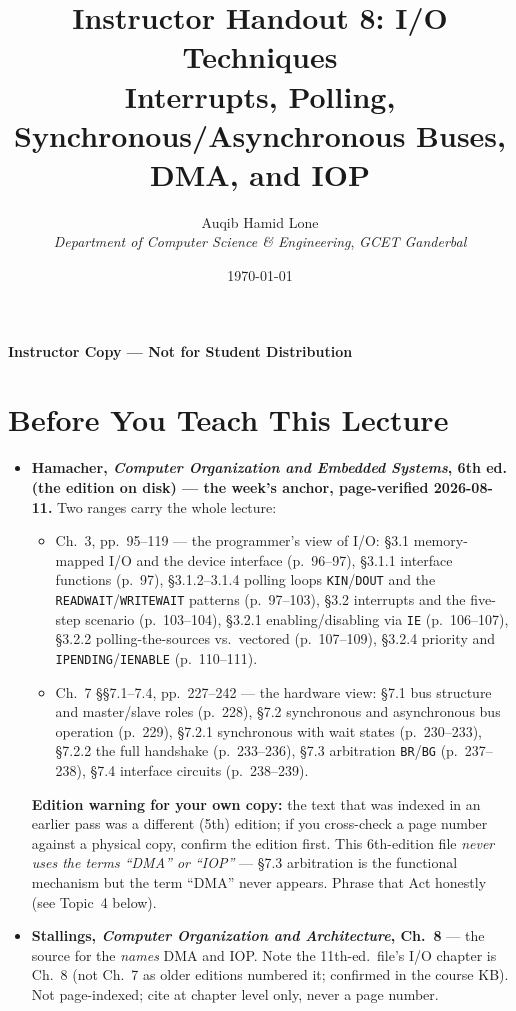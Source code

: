 \documentclass[11pt]{article}
\title{Instructor Handout 8: I/O Techniques\\\large Interrupts, Polling, Synchronous/Asynchronous Buses, DMA, and IOP}
\author{Auqib Hamid Lone\\[0.3em]
  \emph{Department of Computer Science \& Engineering}, \emph{GCET Ganderbal}}
\date{\today}
\begin{document}
\maketitle
{\centering\large\color{negative}\textbf{Instructor Copy --- Not for Student Distribution}\par}
\vspace{0.5cm}

\section{Before You Teach This Lecture}

\begin{sloppypar}
\begin{itemize}
  \item \textbf{Hamacher, \textit{Computer Organization and Embedded Systems}, 6th ed. (the edition on disk) --- the week's anchor, page-verified 2026-08-11.} Two ranges carry the whole lecture:
    \begin{itemize}
      \item Ch.~3, pp.~95--119 --- the programmer's view of I/O: \S3.1 memory-mapped I/O and the device interface (p.~96--97), \S3.1.1 interface functions (p.~97), \S3.1.2--3.1.4 polling loops \texttt{KIN}/\texttt{DOUT} and the \texttt{READWAIT}/\texttt{WRITEWAIT} patterns (p.~97--103), \S3.2 interrupts and the five-step scenario (p.~103--104), \S3.2.1 enabling/disabling via \texttt{IE} (p.~106--107), \S3.2.2 polling-the-sources vs.\ vectored (p.~107--109), \S3.2.4 priority and \texttt{IPENDING}/\texttt{IENABLE} (p.~110--111).
      \item Ch.~7 \S\S7.1--7.4, pp.~227--242 --- the hardware view: \S7.1 bus structure and master/slave roles (p.~228), \S7.2 synchronous and asynchronous bus operation (p.~229), \S7.2.1 synchronous with wait states (p.~230--233), \S7.2.2 the full handshake (p.~233--236), \S7.3 arbitration \texttt{BR}/\texttt{BG} (p.~237--238), \S7.4 interface circuits (p.~238--239).
    \end{itemize}
    \textbf{Edition warning for your own copy:} the text that was indexed in an earlier pass was a different (5th) edition; if you cross-check a page number against a physical copy, confirm the edition first. This 6th-edition file \emph{never uses the terms ``DMA'' or ``IOP''} --- \S7.3 arbitration is the functional mechanism but the term ``DMA'' never appears. Phrase that Act honestly (see Topic~4 below).
  \item \textbf{Stallings, \textit{Computer Organization and Architecture}, Ch.~8} --- the source for the \emph{names} DMA and IOP. Note the 11th-ed.\ file's I/O chapter is Ch.~8 (not Ch.~7 as older editions numbered it; confirmed in the course KB). Not page-indexed; cite at chapter level only, never a page number.

\end{itemize}
\end{sloppypar}
\end{document}

